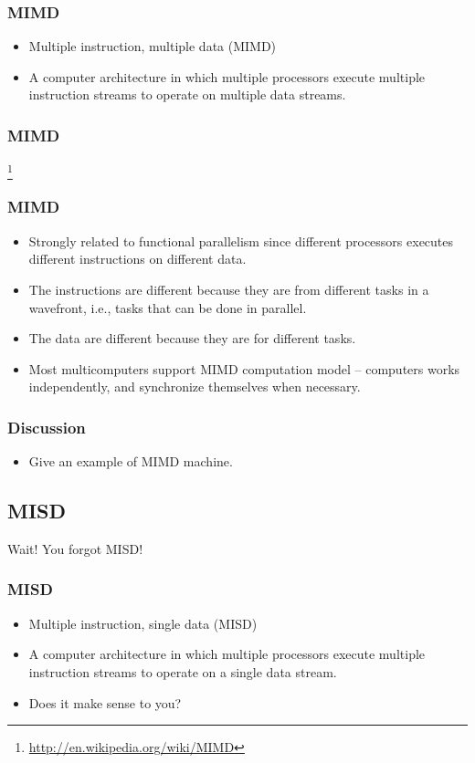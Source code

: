 \documentclass{beamer}
\begin{document}
\begin{CJK}{UTF8}{bsmi}
\begin{frame}
\frametitle{MIMD}
\begin{itemize}
\item Multiple instruction, multiple data (MIMD) 
\item A computer architecture in which multiple processors execute
  multiple instruction streams to operate on multiple data streams.
\end{itemize}
\end{frame}

\begin{frame}
\frametitle{MIMD}
\centerline{}
\footnote{\url{http://en.wikipedia.org/wiki/MIMD}}
\end{frame}

\begin{frame}
\frametitle{MIMD}
\begin{itemize}
\item Strongly related to functional parallelism since different
  processors executes different instructions on different data.
\item The instructions are different because they are from different
  tasks in a wavefront, i.e., tasks that can be done in parallel.
\item The data are different because they are for different tasks.
\item Most multicomputers support MIMD computation model -- computers
  works independently, and synchronize themselves when necessary.
\end{itemize}
\end{frame}

\begin{frame}
\frametitle{Discussion}
\begin{itemize}
\item Give an example of MIMD machine.
\end{itemize}
\end{frame}

\subsection{MISD}

\begin{frame}
\huge Wait! You forgot MISD!
\end{frame}

\begin{frame}
\frametitle{MISD}
\begin{itemize}
\item Multiple instruction, single data (MISD) 
\item A computer architecture in which multiple processors execute
  multiple instruction streams to operate on a single data stream.
\item Does it make sense to you?
\end{itemize}
\end{frame}


\end{CJK}
\end{document}
